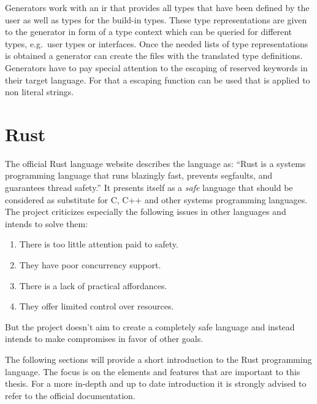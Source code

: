 \documentclass[thesis]{subfiles}
\begin{document}
    Generators work with an \gls{ir} that provides all types that have been defined by the user as well as types for the build-in types.
    These type representations are given to the generator in form of a type context which can be queried for different types, e.g.~user types or interfaces.
    Once the needed lists of type representations is obtained a generator can create the files with the translated type definitions.
    Generators have to pay special attention to the escaping of reserved keywords in their target language.
    For that a escaping function can be used that is applied to non literal strings.

\section{Rust}\label{sec:rust}
  The official Rust language website describes the language as:
  \enquote{Rust is a systems programming language that runs blazingly fast, prevents segfaults, and guarantees thread safety.}\autocite{rust-org}
  It presents itself as a \emph{safe} language that should be considered as substitute for C, C++ and other systems programming languages.
  The project criticizes especially the following issues in other languages and intends to solve them\autocite{rust-faq}:
  \begin{enumerate}
    \item There is too little attention paid to safety.
    \item They have poor concurrency support.
    \item There is a lack of practical affordances.
    \item They offer limited control over resources.
  \end{enumerate}
  But the project doesn't aim to create a completely safe language and instead intends to make compromises in favor of other goals.
  \autocite{rust-faq}

  The following sections will provide a short introduction to the Rust programming language.
  The focus is on the elements and features that are important to this thesis.
  For a more in-depth and up to date introduction it is strongly advised to refer to the official documentation\autocites{rust-org}{rust-doc}{rust-nom}{rust-book}.
\end{document}
